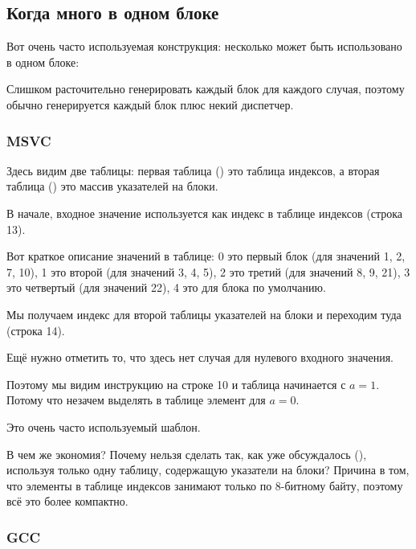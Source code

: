 \subsection{Когда много  в одном блоке}

Вот очень часто используемая конструкция: несколько  может быть использовано в одном блоке:



Слишком расточительно генерировать каждый блок для каждого случая, поэтому обычно
генерируется каждый блок плюс некий диспетчер.

\subsubsection{MSVC}



Здесь видим две таблицы: первая таблица () это таблица индексов,
а вторая таблица () это массив указателей на блоки.

В начале, входное значение используется как индекс в таблице индексов (строка 13). 

Вот краткое описание значений в таблице: 
0 это первый блок  (для значений 1, 2, 7, 10),
1 это второй (для значений 3, 4, 5),
2 это третий (для значений 8, 9, 21),
3 это четвертый (для значений 22),
4 это для блока по умолчанию.

Мы получаем индекс для второй таблицы указателей на блоки и переходим туда (строка 14).

Ещё нужно отметить то, что здесь нет случая для нулевого входного значения.

Поэтому мы видим инструкцию \DEC на строке 10 и таблица начинается с $a=1$.
Потому что незачем выделять в таблице элемент для $a=0$.

Это очень часто используемый шаблон.

В чем же экономия?
Почему нельзя сделать так, как уже обсуждалось (), используя только одну таблицу, содержащую указатели на блоки?
Причина в том, что элементы в таблице индексов занимают только по 8-битному байту, поэтому всё это более компактно.

\subsubsection{GCC}

